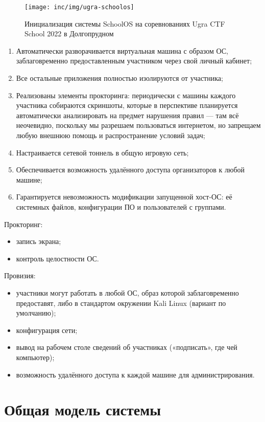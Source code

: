 \begin{figure}
  \centering
  \texttt{[image: inc/img/ugra-schoolos]}
  \caption{Инициализация системы SchoolOS на соревнованиях Ugra CTF School 2022 в Долгопрудном}
  \label{fig:jeopardy}
\end{figure}

\begin{enumerate}
\item Автоматически разворачивается виртуальная машина с образом ОС, заблаговременно предоставленным участником через свой личный кабинет;
\item Все остальные приложения полностью изолируются от участника;
\item Реализованы элементы прокторинга: периодически с машины каждого участника собираются скриншоты, которые в перспективе планируется автоматически анализировать на предмет нарушения правил — там всё неочевидно, поскольку мы разрешаем пользоваться интернетом, но запрещаем любую внешнюю помощь и распространение условий задач;
\item Настраивается сетевой тоннель в общую игровую сеть;
\item Обеспечивается возможность удалённого доступа организаторов к любой машине;
\item Гарантируется невозможность модификации запущенной хост-ОС: её системных файлов, конфигурации ПО и пользователей с группами.
\end{enumerate}

Прокторинг:
\begin{itemize}
\item
  запись экрана;
\item
  контроль целостности ОС.
\end{itemize}

Провизия:
\begin{itemize}
\item
  участники могут работать в любой ОС, образ которой заблаговременно предоставят, либо в стандартом окружении Kali Linux (вариант по умолчанию);
\item
  конфигурация сети;
\item
  вывод на рабочем столе сведений об участниках («подписать», где чей компьютер);
\item
  возможность удалённого доступа к каждой машине для администрирования.
\end{itemize}




\section{Общая модель системы}


